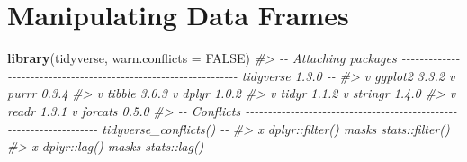 \documentclass[
]{report}
\newenvironment{Shaded}{\begin{snugshade}}{\end{snugshade}}
\newcommand{\CommentTok}[1]{\textcolor[rgb]{0.56,0.35,0.01}{\textit{#1}}}
\newcommand{\DataTypeTok}[1]{\textcolor[rgb]{0.13,0.29,0.53}{#1}}
\newcommand{\KeywordTok}[1]{\textcolor[rgb]{0.13,0.29,0.53}{\textbf{#1}}}
\newcommand{\NormalTok}[1]{#1}
\newcommand{\OtherTok}[1]{\textcolor[rgb]{0.56,0.35,0.01}{#1}}
\begin{document}
\hypertarget{manipulating-data-frames}{%
\chapter{Manipulating Data Frames}\label{manipulating-data-frames}}

\begin{Shaded}
\begin{Highlighting}[]
\KeywordTok{library}\NormalTok{(tidyverse, }\DataTypeTok{warn.conflicts =} \OtherTok{FALSE}\NormalTok{)}
\CommentTok{\#\textgreater{} {-}{-} Attaching packages {-}{-}{-}{-}{-}{-}{-}{-}{-}{-}{-}{-}{-}{-}{-}{-}{-}{-}{-}{-}{-}{-}{-}{-}{-}{-}{-}{-}{-}{-}{-}{-}{-}{-}{-}{-}{-}{-}{-}{-}{-}{-}{-}{-}{-}{-}{-}{-}{-}{-}{-}{-}{-}{-}{-}{-}{-}{-}{-}{-}{-}{-}{-}{-} tidyverse 1.3.0 {-}{-}}
\CommentTok{\#\textgreater{} v ggplot2 3.3.2     v purrr   0.3.4}
\CommentTok{\#\textgreater{} v tibble  3.0.3     v dplyr   1.0.2}
\CommentTok{\#\textgreater{} v tidyr   1.1.2     v stringr 1.4.0}
\CommentTok{\#\textgreater{} v readr   1.3.1     v forcats 0.5.0}
\CommentTok{\#\textgreater{} {-}{-} Conflicts {-}{-}{-}{-}{-}{-}{-}{-}{-}{-}{-}{-}{-}{-}{-}{-}{-}{-}{-}{-}{-}{-}{-}{-}{-}{-}{-}{-}{-}{-}{-}{-}{-}{-}{-}{-}{-}{-}{-}{-}{-}{-}{-}{-}{-}{-}{-}{-}{-}{-}{-}{-}{-}{-}{-}{-}{-}{-}{-}{-}{-}{-}{-}{-}{-}{-}{-} tidyverse\_conflicts() {-}{-}}
\CommentTok{\#\textgreater{} x dplyr::filter() masks stats::filter()}
\CommentTok{\#\textgreater{} x dplyr::lag()    masks stats::lag()}


\end{Highlighting}
\end{Shaded}
\end{document}

